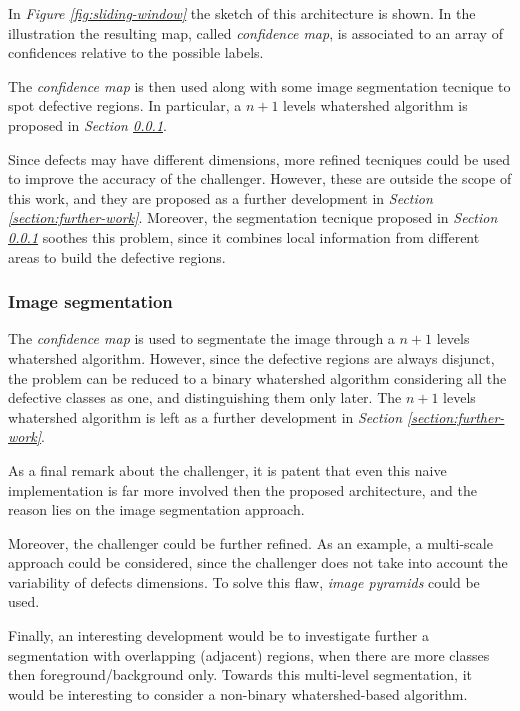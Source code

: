 \par{
	In \emph{Figure \ref{fig:sliding-window}} the sketch of this architecture is shown. In the illustration the resulting map, called \emph{confidence map}, is associated to an array of confidences relative to the possible labels. 
}
\par{
	The \emph{confidence map} is then used along with some image segmentation tecnique to spot defective regions. In particular, a $n+1$ levels whatershed algorithm is proposed in \emph{Section \ref{section:challenger:image-segmentation}}.
}
\par{
	Since defects may have different dimensions, more refined tecniques could be used to improve the accuracy of the challenger. However, these are outside the scope of this work, and they are proposed as a further development in \emph{Section \ref{section:further-work}}. Moreover, the segmentation tecnique proposed in \emph{Section \ref{section:challenger:image-segmentation}} soothes this problem, since it combines local information from different areas to build the defective regions.
}
\subsubsection{Image segmentation}\label{section:challenger:image-segmentation}
\par{
	The \emph{confidence map} is used to segmentate the image through a $n+1$ levels whatershed algorithm. However, since the defective regions are always disjunct, the problem can be reduced to a binary whatershed algorithm \cite{ieee:87344} considering all the defective classes as one, and distinguishing them only later. The $n+1$ levels whatershed algorithm is left as a further development in \emph{Section \ref{section:further-work}}.
}
\par{
	As a final remark about the challenger, it is patent that even this naive implementation is far more involved then the proposed architecture, and the reason lies on the image segmentation approach.
}
\par{
	Moreover, the challenger could be further refined. As an example, a multi-scale approach could be considered, since the challenger does not take into account the variability of defects dimensions. To solve this flaw, \emph{image pyramids} could be used.
}
\par{
	Finally, an interesting development would be to investigate further a segmentation with overlapping (adjacent) regions, when there are more classes then foreground/background only. Towards this multi-level segmentation, it would be interesting to consider a non-binary whatershed-based algorithm.
}